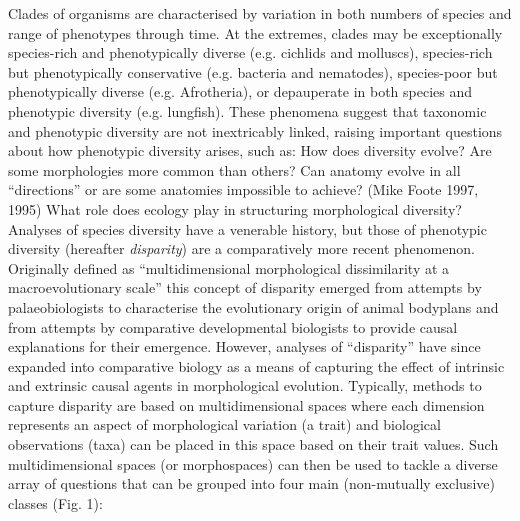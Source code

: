 \documentclass[12pt,letterpaper]{article}
\begin{document}
\noindent Clades of organisms are characterised by variation in both numbers of species and range of phenotypes through time.
At the extremes, clades may be exceptionally species-rich and phenotypically diverse (e.g. cichlids and molluscs), species-rich but phenotypically conservative (e.g. bacteria and nematodes), species-poor but phenotypically diverse (e.g. Afrotheria), or depauperate in both species and phenotypic diversity (e.g. lungfish).
These phenomena suggest that taxonomic and phenotypic diversity are not inextricably linked, raising important questions about how phenotypic diversity arises, such as:
How does diversity evolve?
Are some morphologies more common than others?
Can anatomy evolve in all ``directions'' or are some anatomies impossible to achieve? (Mike Foote 1997, 1995)
What role does ecology play in structuring morphological diversity?
Analyses of species diversity have a venerable history, but those of phenotypic diversity (hereafter \emph{disparity}) are a comparatively more recent phenomenon. Originally defined as ``multidimensional morphological dissimilarity at a macroevolutionary scale'' \citep{runnegar1987rates,Gould1991-nh} this concept of disparity emerged from attempts by palaeobiologists to characterise the evolutionary origin of animal bodyplans and from attempts by comparative developmental biologists to provide causal explanations for their emergence.
However, analyses of ``disparity'' have since expanded into comparative biology as a means of capturing the effect of intrinsic and extrinsic causal agents in morphological evolution.
Typically, methods to capture disparity are based on multidimensional spaces where each dimension represents an aspect of morphological variation (a trait) and biological observations (taxa) can be placed in this space based on their trait values.
Such multidimensional spaces (or morphospaces) can then be used to tackle a diverse array of questions that can be grouped into four main (non-mutually exclusive) classes (Fig. 1):
\end{document}
